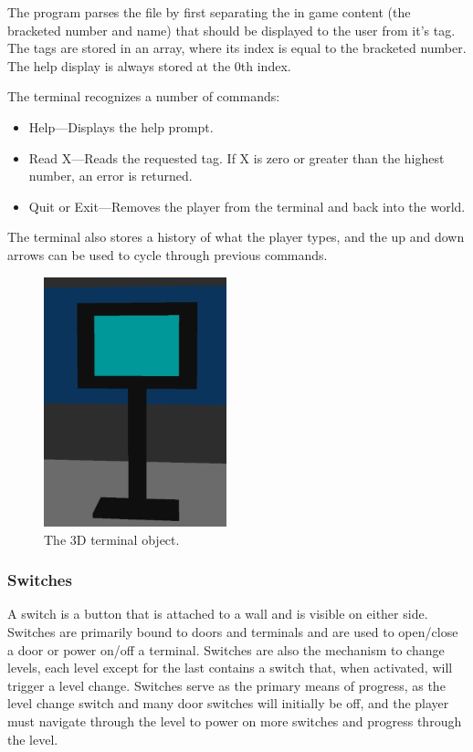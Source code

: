 \documentclass{article}
\begin{document}
The program parses the file by first separating the in game content (the bracketed number and name) that should be displayed to the user from it's tag. The tags are stored in an array, where its index is equal to the bracketed number. The help display is always stored at the 0th index.

The terminal recognizes a number of commands:

\begin{itemize}
	\item Help---Displays the help prompt.
	\item Read X---Reads the requested tag. If X is zero or greater than the highest number, an error is returned.
	\item Quit or Exit---Removes the player from the terminal and back into the world.
\end{itemize}

The terminal also stores a history of what the player types, and the up and down arrows can be used to cycle through previous commands.

\begin{figure}[H]
	\centering
	\includegraphics[width=200px]{terminal}
	\caption{The 3D terminal object.}
	\label{fig:3Dterminal}
\end{figure}

\subsubsection{Switches} \label{subsubsec:switch}

A switch is a button that is attached to a wall and is visible on either side. Switches are primarily bound to doors and terminals and are used to open/close a door or power on/off a terminal. Switches are also the mechanism to change levels, each level except for the last contains a switch that, when activated, will trigger a level change. Switches serve as the primary means of progress, as the level change switch and many door switches will initially be off, and the player must navigate through the level to power on more switches and progress through the level.
\end{document}
